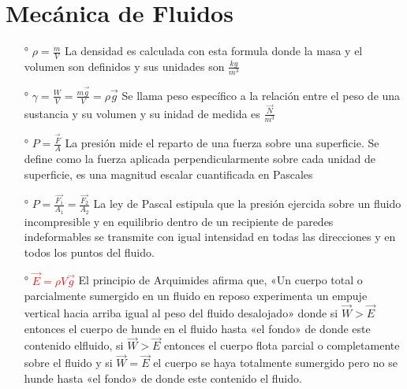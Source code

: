 \documentclass[a4paper, 12pt]{article}
\begin{document}
\section{Mecánica de Fluidos}
\begin{enumerate}
    \item [°] {$\rho=\frac{m}{V}$} La densidad es calculada con esta formula donde la masa y el volumen son definidos y sus unidades son $\frac{kg}{m^{3}}$
    \item [°] {$\gamma=\frac{W}{V}=\frac{m\vec{g}}{V}=\rho\vec{g}$} Se llama peso específico a la relación entre el peso de una sustancia y su volumen y su inidad de medida es $\frac{\vec{N}}{m^{3}}$
    \item [°] {$P=\frac{\vec{F}}{A}$} La presión mide el reparto de una fuerza sobre una superficie. Se define como la fuerza aplicada perpendicularmente sobre cada unidad de superficie, es una magnitud escalar cuantificada en Pascales
    \item [°] {$P=\frac{\vec{F_{1}}}{A_{1}}=\frac{\vec{F_{2}}}{A_{2}}$} La ley de Pascal estipula que la presión ejercida sobre un fluido incompresible y en equilibrio dentro de un recipiente de paredes indeformables se transmite con igual intensidad en todas las direcciones y en todos los puntos del fluido.
    \item[°] \textcolor{red}{{$\vec{E}=\rho V\vec{g}$}} El principio de Arquimides afirma que, «Un cuerpo total o parcialmente sumergido en un fluido en reposo experimenta un empuje vertical hacia arriba igual al peso del fluido desalojado» donde si $\vec{W}>\vec{E}$ entonces el cuerpo de hunde en el fluido hasta «el fondo» de donde este contenido elfluido, si $\vec{W}>\vec{E}$ entonces el cuerpo flota parcial o completamente sobre el fluido y si $\vec{W}=\vec{E}$ el cuerpo se haya totalmente sumergido pero no se hunde hasta «el fondo» de donde este contenido el fluido.
    
\end{enumerate}
\end{document}
